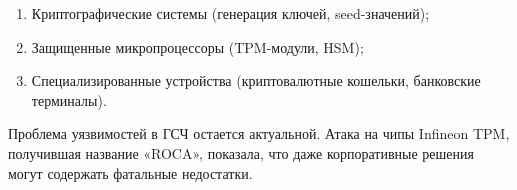 \begin{enumerate}
\def\labelenumi{\arabic{enumi}.}
\item
  Криптографические системы (генерация ключей, seed-значений);
\item
  Защищенные микропроцессоры (TPM-модули, HSM);
\item
  Специализированные устройства (криптовалютные кошельки, банковские
  терминалы).
\end{enumerate}

Проблема уязвимостей в ГСЧ остается актуальной. Атака на чипы Infineon
TPM, получившая название «ROCA», показала, что даже корпоративные
решения могут содержать фатальные недостатки.

